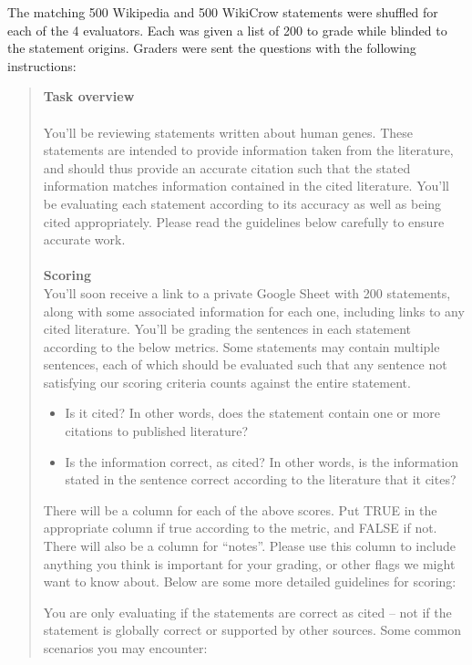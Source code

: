\documentclass{article}
\begin{document}
The matching 500 Wikipedia and 500 WikiCrow statements were shuffled for each of the 4 evaluators. Each was given a list of 200 to grade while blinded to the statement origins. Graders were sent the questions with the following instructions: 

\begin{quote}
\textbf{Task overview}\\ \\
You’ll be reviewing statements written about human genes. These statements are intended to provide information taken from the literature, and should thus provide an accurate citation such that the stated information matches information contained in the cited literature. You’ll be evaluating each statement according to its accuracy as well as being cited appropriately. Please read the guidelines below carefully to ensure accurate work.\\ \\
\textbf{Scoring} \\

You’ll soon receive a link to a private Google Sheet with 200 statements, along with some associated information for each one, including links to any cited literature. You’ll be grading the sentences in each statement according to the below metrics. Some statements may contain multiple sentences, each of which should be evaluated such that any sentence not satisfying our scoring criteria counts against the entire statement. \\
\begin{itemize}
\item{Is it cited? In other words, does the statement contain one or more citations to published literature?}
\item{Is the information correct, as cited? In other words, is the information stated in the sentence correct according to the literature that it cites?\\}
\end{itemize}

There will be a column for each of the above scores. Put TRUE in the appropriate column if true according to the metric, and FALSE if not. There will also be a column for “notes”. Please use this column to include anything you think is important for your grading, or other flags we might want to know about. Below are some more detailed guidelines for scoring:

You are only evaluating if the statements are correct as cited -- not if the statement is globally correct or supported by other sources. Some common scenarios you may encounter:


\end{quote}
\end{document}
